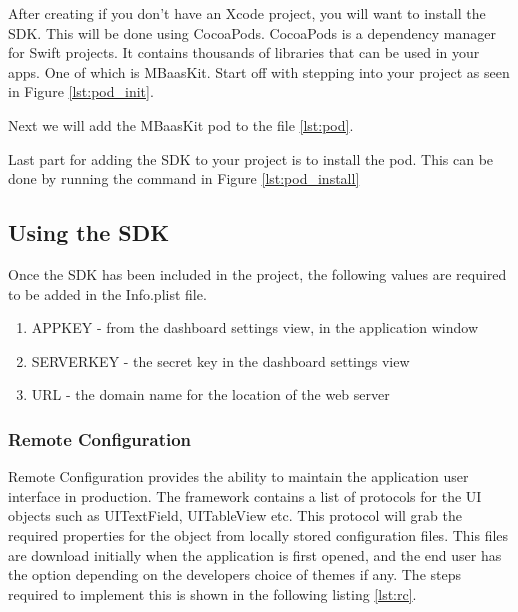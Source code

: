 After creating if you don't have an Xcode project, you will want to install the SDK. This will be done using CocoaPods. CocoaPods is a dependency manager for Swift projects. It contains thousands of libraries that can be used in your apps. One of which is MBaasKit. Start off with stepping into your project as seen in Figure \ref{lst:pod_init}.

Next we will add the MBaasKit pod to the file \ref{lst:pod}.



Last part for adding the SDK to your project is to install the pod. This can be done by running the command in Figure \ref{lst:pod_install}



\subsection{Using the SDK}

Once the SDK has been included in the project, the following values are required to be added in the Info.plist file.

\begin{enumerate}
  \item APPKEY - from the dashboard settings view, in the application window
  \item SERVERKEY - the secret key in the dashboard settings view
  \item URL - the domain name for the location of the web server
\end{enumerate}

\subsubsection{Remote Configuration}

Remote Configuration provides the ability to maintain the application user interface in production. The framework contains a list of protocols for the UI objects such as UITextField, UITableView etc. This protocol will grab the required properties for the object from locally stored configuration files. This files are download initially when the application is first opened, and the end user has the option depending on the developers choice of themes if any. The steps required to implement this is shown in the following listing \ref{lst:rc}.

